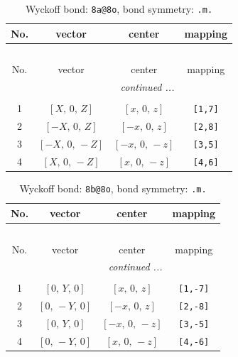 \documentclass[fleqn,8pt]{jsarticle}
\begin{document}
\begin{longtable}{cccc}
\caption{Wyckoff bond: {\tt 8a@8o}, bond symmetry: {\tt .m.}}
 \\
 \hline \hline
No. & vector & center & mapping \\ \hline \endfirsthead

\multicolumn{3}{l}{\tablename\ \thetable{}} \\
 \hline \hline
No. & vector & center & mapping \\ \hline \endhead

 \hline \hline
\multicolumn{3}{r}{\footnotesize\it continued ...} \\ \endfoot

 \hline \hline
\multicolumn{3}{r}{} \\ \endlastfoot

1 & $\left[ X,\, 0,\, Z \right]$ & $\left[ x,\, 0,\, z \right]$ & {\tt [1,7]} \\ \hline
2 & $\left[ - X,\, 0,\, Z \right]$ & $\left[ - x,\, 0,\, z \right]$ & {\tt [2,8]} \\ \hline
3 & $\left[ - X,\, 0,\, - Z \right]$ & $\left[ - x,\, 0,\, - z \right]$ & {\tt [3,5]} \\ \hline
4 & $\left[ X,\, 0,\, - Z \right]$ & $\left[ x,\, 0,\, - z \right]$ & {\tt [4,6]} \\
\end{longtable}
\renewcommand{\arraystretch}{1.2}
\begin{longtable}{cccc}
\caption{Wyckoff bond: {\tt 8b@8o}, bond symmetry: {\tt .m.}}
 \\
 \hline \hline
No. & vector & center & mapping \\ \hline \endfirsthead

\multicolumn{3}{l}{\tablename\ \thetable{}} \\
 \hline \hline
No. & vector & center & mapping \\ \hline \endhead

 \hline \hline
\multicolumn{3}{r}{\footnotesize\it continued ...} \\ \endfoot

 \hline \hline
\multicolumn{3}{r}{} \\ \endlastfoot

1 & $\left[ 0,\, Y,\, 0 \right]$ & $\left[ x,\, 0,\, z \right]$ & {\tt [1,-7]} \\ \hline
2 & $\left[ 0,\, - Y,\, 0 \right]$ & $\left[ - x,\, 0,\, z \right]$ & {\tt [2,-8]} \\ \hline
3 & $\left[ 0,\, Y,\, 0 \right]$ & $\left[ - x,\, 0,\, - z \right]$ & {\tt [3,-5]} \\ \hline
4 & $\left[ 0,\, - Y,\, 0 \right]$ & $\left[ x,\, 0,\, - z \right]$ & {\tt [4,-6]} \\
\end{longtable}
\end{document}
